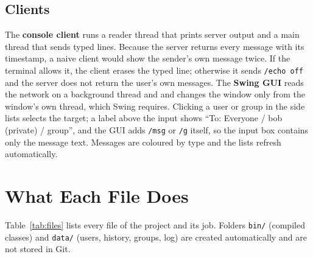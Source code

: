 \documentclass[conference]{IEEEtran}
\newcommand{\code}[1]{\texttt{#1}}
\begin{document}
\subsection{Clients}
The \textbf{console client} runs a reader thread that prints server output and a main thread that sends typed lines. Because the server returns every
message with its timestamp, a naive client would show the sender's own message twice. If the terminal allows it, the client erases the typed line;
otherwise it sends \code{/echo off} and the server does not return the user's own messages.
The \textbf{Swing GUI} reads the network on a background thread and and changes the window only from the window's own thread, which Swing requires.
Clicking a user or group in the side lists selects the target; a label above the input shows ``To: Everyone / bob (private) / group'',
and the GUI adds \code{/msg} or \code{/g} itself, so the input box contains only the message text. Messages are coloured by type and the lists refresh automatically.

\section{What Each File Does}\label{sec:files}
Table~\ref{tab:files} lists every file of the project and its job. Folders \code{bin/} (compiled classes) and \code{data/} (users, history, groups, log)
are created automatically and are not stored in Git.
\end{document}
